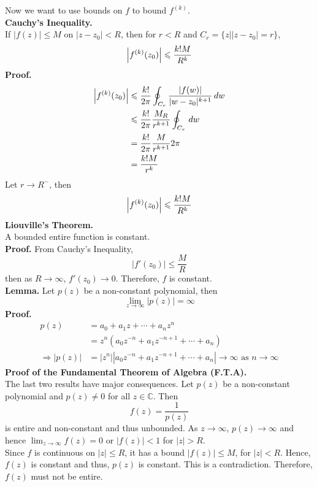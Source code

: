 \documentclass[11pt]{article}
\DeclarePairedDelimiter\abs{\lvert}{\rvert}
\begin{document}
\newline
Now we want to use bounds on $f$ to bound $f^{(k)}$. \\
\newline
\textbf{Cauchy's Inequality.} \\
If $|f(z)| \leqslant M$ on $|z - z_0| < R$, then for $r < R$ and $C_r = \{z||z - z_0| = r\}$, 
$$\abs[\Big]{f^{(k)}(z_0)} \leqslant \frac{k!M}{R^k}$$
\textbf{Proof.}
\begin{align*}
\abs*{f^{(k)}(z_0)} &\leqslant \frac{k!}{2\pi} \oint_{C_r} \frac{|f(w)|}{|w-z_0|^{k + 1}} \, dw \\
&\leqslant \frac{k!}{2\pi}\frac{M_R}{r^{k + 1}} \oint_{C_r} \,dw\\
&=\frac{k!}{2\pi}\frac{M}{r^{k + 1}}2\pi \\
&=\frac{k!M}{r^k}
\end{align*}
Let $r \to R^-$, then 
$$\abs*{f^{(k)}(z_0)} \leqslant \frac{k!M}{R^k}$$
\newline
\textbf{Liouville's Theorem.}\\
A bounded entire function is constant. \\
\textbf{Proof.} From Cauchy's Inequality, 
$$|f'(z_0)| \leqslant \frac{M}{R}$$
then as $R \to \infty$, $f'(z_0) \to 0$. Therefore, $f$ is constant. \\
\newline
\textbf{Lemma.} Let $p(z)$ be a non-constant polynomial, then 
$$\lim_{z \to \infty} |p(z)| = \infty$$
\textbf{Proof.}
\begin{align*}
p(z) &= a_0 + a_1z + \cdots + a_nz^n\\
&= z^n(a_0z^{-n} + a_1z^{-n + 1} + \cdots + a_n) \\ 
\Longrightarrow |p(z)| &= |z^n||a_0z^{-n} + a_1z^{-n + 1} + \cdots + a_n| \to \infty \text{ as } n \to \infty
\end{align*}
\textbf{Proof of the Fundamental Theorem of Algebra (F.T.A).} \\
The last two results have major consequences. Let $p(z)$ be a non-constant polynomial and $p(z) \neq 0$ for all $z \in \mathbb{C}$. Then
$$f(z) = \frac{1}{p(z)}$$ 
is entire and non-constant and thus unbounded. 
As $z \to \infty$, $p(z) \to \infty$ and hence $\lim_{z \to \infty} f(z) = 0$ or $|f(z)| < 1$ for $|z| > R$. \\
Since $f$ is continuous on $|z| \leqslant R$, it has a bound $|f(z)| \leqslant M$, for $|z| < R$. Hence, $f(z)$ is constant and thus, $p(z)$ is constant. This is a contradiction. Therefore, $f(z)$ must not be entire. \\
\end{document}
